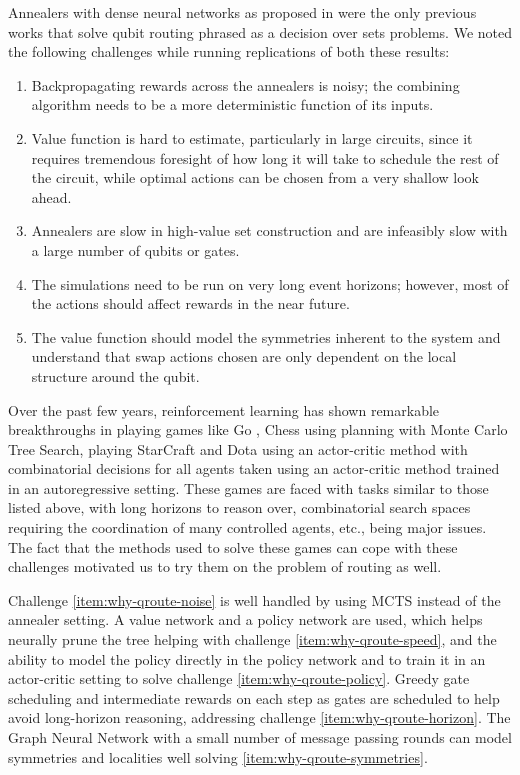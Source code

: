 Annealers with dense neural networks as proposed in \cite{qroute_dqn1,qroute_dqn2} were the only previous works that solve qubit routing phrased as a decision over sets problems. We noted the following challenges while running replications of both these results:
\begin{enumerate}
    \item\label{item:why-qroute-noise} Backpropagating rewards across the annealers is noisy; the combining algorithm needs to be a more deterministic function of its inputs.
    \item\label{item:why-qroute-policy} Value function is hard to estimate, particularly in large circuits, since it requires tremendous foresight of how long it will take to schedule the rest of the circuit, while optimal actions can be chosen from a very shallow look ahead.
    \item\label{item:why-qroute-speed} Annealers are slow in high-value set construction and are infeasibly slow with a large number of qubits or gates.
    \item\label{item:why-qroute-horizon} The simulations need to be run on very long event horizons; however, most of the actions should affect rewards in the near future. 
    \item\label{item:why-qroute-symmetries} The value function should model the symmetries inherent to the system and understand that swap actions chosen are only dependent on the local structure around the qubit.
\end{enumerate}

Over the past few years, reinforcement learning has shown remarkable breakthroughs in playing games like Go \cite{mcts-alphago}, Chess \cite{mcts-alphazero} using planning with Monte Carlo Tree Search, playing StarCraft \cite{rl-alphastar-blog} and Dota \cite{rl-openai-dota} using an actor-critic method with combinatorial decisions for all agents taken using an actor-critic method trained in an autoregressive setting. These games are faced with tasks similar to those listed above, with long horizons to reason over, combinatorial search spaces requiring the coordination of many controlled agents, etc., being major issues. The fact that the methods used to solve these games can cope with these challenges motivated us to try them on the problem of routing as well.

Challenge \ref{item:why-qroute-noise} is well handled by using MCTS instead of the annealer setting. A value network and a policy network are used, which helps neurally prune the tree helping with challenge \ref{item:why-qroute-speed}, and the ability to model the policy directly in the policy network and to train it in an actor-critic setting to solve challenge \ref{item:why-qroute-policy}. Greedy gate scheduling and intermediate rewards on each step as gates are scheduled to help avoid long-horizon reasoning, addressing challenge \ref{item:why-qroute-horizon}. The Graph Neural Network with a small number of message passing rounds can model symmetries and localities well solving \ref{item:why-qroute-symmetries}.

